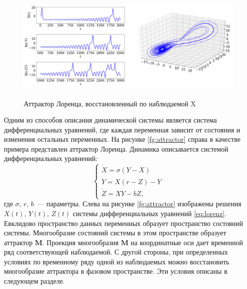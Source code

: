\documentclass[12pt]{extarticle}
\begin{document}
\begin{figure}[ht]
\centering
{\includegraphics[width=1\textwidth]{./images/attractor_X.png}}
\caption{Аттрактор Лоренца, восстановленный по наблюдаемой X}
\label{fg:attractor_x}
\end{figure}

Одним из способов описания динамической системы является система дифференциальных уравнений, где каждая переменная зависит от состояния и изменения остальных переменных. На рисунке \eqref{fg:attractor} справа в качестве примера представлен аттрактор Лоренца. Динамика описывается системой дифференциальных уравнений:
\begin{equation}
    \begin{cases}
        \dot X = \sigma(Y -X)\\
        \dot Y = X(r - Z) - Y\\
        \dot Z = XY - bZ,
    \end{cases}
    \label{eq:lorenz}
\end{equation}
где $\sigma, \, r,\, b$~--- параметры. Слева на рисунке \eqref{fg:attractor} изображены решения $X(t),\, Y(t),\, Z(t)$ системы дифференциальных уравнений \eqref{eq:lorenz}.
Евклидово пространство данных переменных образует пространство состояний системы. Многообразие состояний системы в этом пространстве образует аттрактор $\mathbf{M}$. Проекция многообразия $\mathbf{M}$ на координатные оси дает временной ряд соответствующей наблюдаемой. С другой стороны, при определенных условиях по временному ряду одной из наблюдаемых можно восстановить многообразие аттрактора в фазовом пространстве. Эти условия описаны в следующем разделе.
\end{document}
